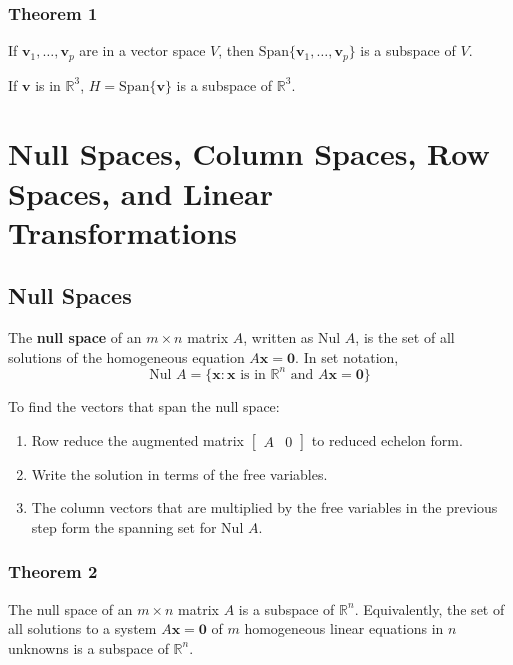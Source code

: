 \documentclass{article}
\begin{document}
\subsubsection*{Theorem 1}
If $\mathbf{v}_1,\ldots, \mathbf{v}_p$ are in a vector space $V$, then
$\text{Span}\{\mathbf{v}_1,\ldots, \mathbf{v}_p\}$ is a subspace of $V$.

\vspace{1em}

If $\mathbf{v}$ is in $\mathbb{R}^3$, $H=\text{Span}\{\mathbf{v}\}$ is a subspace of $\mathbb{R}^3$.

\section*{Null Spaces, Column Spaces, Row Spaces, and Linear Transformations}
\subsection*{Null Spaces}
The \textbf{null space} of an $m\times n$ matrix $A$, written as $\text{Nul } A$, is the set of all
solutions of the homogeneous equation $A\mathbf{x}=\mathbf{0}$. In set notation,
\[\text{Nul } A = \{\mathbf{x} : \mathbf{x} \text{ is in } \mathbb{R}^n \text{ and }A\mathbf{x}=
\mathbf{0}\}\]

To find the vectors that span the null space:
\begin{enumerate}
    \item Row reduce the augmented matrix $\begin{bmatrix}A & 0\end{bmatrix}$ to reduced echelon
    form.
    \item Write the solution in terms of the free variables.
    \item The column vectors that are multiplied by the free variables in the previous step form
    the spanning set for $\text{Nul } A$.
\end{enumerate}

\subsubsection*{Theorem 2}
The null space of an $m\times n$ matrix $A$ is a subspace of $\mathbb{R}^n$. Equivalently, the set
of all solutions to a system $A\mathbf{x}=\mathbf{0}$ of $m$ homogeneous linear equations in $n$
unknowns is a subspace of $\mathbb{R}^n$.

\vspace{1em}
\end{document}
